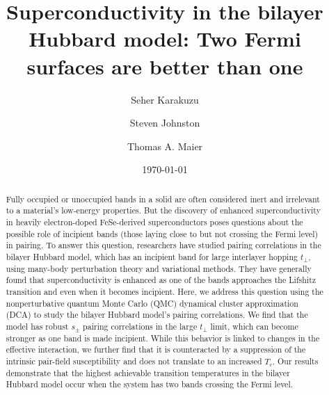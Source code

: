 \documentclass[prb,twocolumn,amsmath,amssymb,superscriptaddress,floatfix,nofootinbib]{revtex4-2}
\begin{document}
\title{Superconductivity in the bilayer Hubbard model: Two Fermi surfaces are better than one}
\date{\today}



\author{Seher Karakuzu}

\author{Steven Johnston}

\author{Thomas A. Maier}

\begin{abstract}
Fully occupied or unoccupied bands in a solid are often considered inert and irrelevant to a material's low-energy properties. But the discovery of enhanced superconductivity in heavily electron-doped FeSe-derived superconductors poses questions about the possible role of incipient bands (those laying close to but not crossing the Fermi level) in pairing. To answer this question, researchers have studied pairing correlations in the bilayer Hubbard model, which has an incipient band for large interlayer hopping $t_\perp$, using many-body perturbation theory and variational methods. They have generally found that superconductivity is enhanced as one of the bands approaches the Lifshitz transition and even when it becomes incipient. Here, we address this question using the nonperturbative quantum Monte Carlo (QMC) dynamical cluster approximation (DCA) to study the bilayer Hubbard model's pairing correlations. We find that the model has robust $s_\pm$ pairing correlations in the large $t_\perp$ limit, which can become stronger as one band is made incipient. While this behavior is linked to changes in the effective interaction, we further find that it is  counteracted by a suppression of the intrinsic pair-field susceptibility and does not translate to an increased $T_c$. Our results demonstrate that the highest achievable transition temperatures in the bilayer Hubbard model occur when the system has two bands crossing the Fermi level.
\end{abstract}
\maketitle
\end{document}
